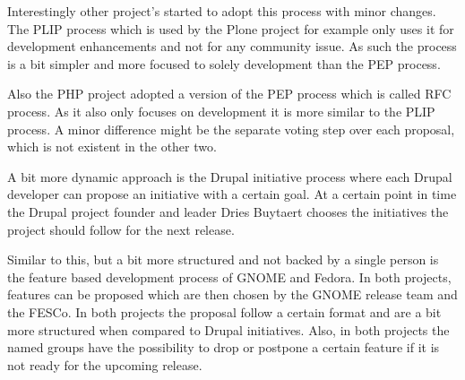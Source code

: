 Interestingly other project's started to adopt this process with minor changes.
The \ac{PLIP} process which is used by the Plone project for example only uses
it for development enhancements and not for any community issue. As such the
process is a bit simpler and more focused to solely development than the
\ac{PEP} process. 

Also the PHP project adopted a version of the \ac{PEP} process which is called
\ac{RFC} process. As it also only focuses on development it is more similar to
the \ac{PLIP} process. A minor difference might be the separate voting step
over each proposal, which is not existent in the other two.

A bit more dynamic approach is the Drupal initiative process where each Drupal
developer can propose an initiative with a certain goal. At a certain point in
time the Drupal project founder and leader Dries Buytaert chooses the
initiatives the project should follow for the next release.

Similar to this, but a bit more structured and not backed by a single person is
the feature based development process of GNOME and Fedora. In both projects,
features can be proposed which are then chosen by the GNOME release team and
the \ac{FESCo}. In both projects the proposal follow a certain format and are a
bit more structured when compared to Drupal initiatives. Also, in both projects
the named groups have the possibility to drop or postpone a certain feature if
it is not ready for the upcoming release.

